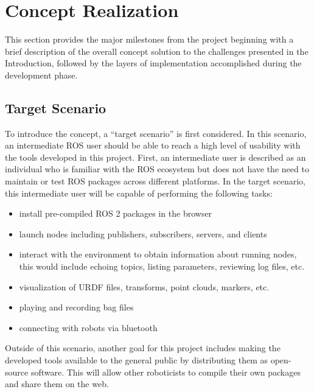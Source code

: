 \chapter{Concept Realization}\label{cha:concept}

    This section provides the major milestones from the project beginning with a
    brief description of the overall concept solution to the challenges presented
    in the Introduction, followed by the layers of implementation accomplished 
    during the development phase.


\section{Target Scenario}\label{sec:target}



    To introduce the concept, a ``target scenario'' is first considered. In this
    scenario, an intermediate \ac{ROS} user should be able to reach a high level 
    of usability with the tools developed in this project. First, an
    intermediate user is described as an individual who is familiar with the 
    \ac{ROS} ecosystem but does not have the need to maintain or test \ac{ROS} packages
    across different platforms. In the target scenario, this intermediate
    user will be capable of performing the following tasks:

    \begin{itemize}
        \item install pre-compiled ROS 2 packages in the browser
        \item launch nodes including publishers, subscribers, servers, and clients
        \item interact with the environment to obtain information about 
                running nodes, this would include echoing topics, listing 
                parameters, reviewing log files, etc.
        \item visualization of \ac{URDF} files, transforms, point clouds, markers, etc.
        \item playing and recording bag files %
        \item connecting with robots via bluetooth
    \end{itemize}

    Outside of this scenario, another goal for this project includes making the 
    developed tools available to the general public by distributing them as
    open-source software. This will allow other roboticists to compile their own
    packages and share them on the web.


